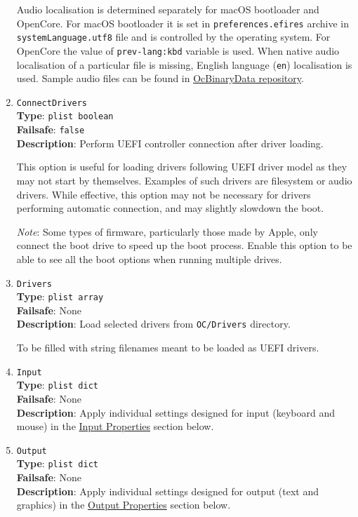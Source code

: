 \documentclass[]{article}
\begin{document}
\begin{enumerate}
  Audio localisation is determined separately for macOS bootloader and OpenCore.
  For macOS bootloader it is set in \texttt{preferences.efires} archive in
  \texttt{systemLanguage.utf8} file and is controlled by the operating system.
  For OpenCore the value of \texttt{prev-lang:kbd} variable is used.
  When native audio localisation of a particular file is missing, English language
  (\texttt{en}) localisation is used. Sample audio files can be found in
  \href{https://github.com/acidanthera/OcBinaryData}{OcBinaryData repository}.

\item
  \texttt{ConnectDrivers}\\
  \textbf{Type}: \texttt{plist\ boolean}\\
  \textbf{Failsafe}: \texttt{false}\\
  \textbf{Description}: Perform UEFI controller connection after driver loading.

  This option is useful for loading drivers following UEFI driver model
  as they may not start by themselves. Examples of such drivers are filesystem
  or audio drivers. While effective, this option may not be necessary for drivers
  performing automatic connection, and may slightly slowdown the boot.

  \emph{Note}: Some types of firmware, particularly those made by Apple, only connect the boot
  drive to speed up the boot process. Enable this option to be able to see all the
  boot options when running multiple drives.

\item
  \texttt{Drivers}\\
  \textbf{Type}: \texttt{plist\ array}\\
  \textbf{Failsafe}: None\\
  \textbf{Description}: Load selected drivers from \texttt{OC/Drivers}
  directory.

  To be filled with string filenames meant to be loaded as UEFI drivers.

\item
  \texttt{Input}\\
  \textbf{Type}: \texttt{plist\ dict}\\
  \textbf{Failsafe}: None\\
  \textbf{Description}: Apply individual settings designed for input (keyboard and mouse) in the
  \hyperref[uefiinputprops]{Input Properties} section below.

\item
  \texttt{Output}\\
  \textbf{Type}: \texttt{plist\ dict}\\
  \textbf{Failsafe}: None\\
  \textbf{Description}: Apply individual settings designed for output (text and graphics) in the
  \hyperref[uefioutputprops]{Output Properties} section below.


\end{enumerate}
\end{document}
